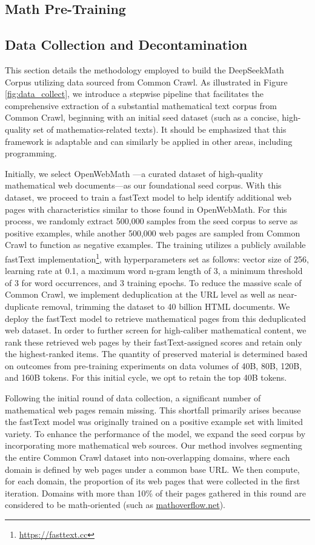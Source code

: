 \begin{itemize}[topsep=0pt]
\section{Math Pre-Training}

\subsection{Data Collection and Decontamination} This section details the methodology employed to build the DeepSeekMath Corpus utilizing data sourced from Common Crawl. As illustrated in Figure \ref{fig:data_collect}, we introduce a stepwise pipeline that facilitates the comprehensive extraction of a substantial mathematical text corpus from Common Crawl, beginning with an initial seed dataset (such as a concise, high-quality set of mathematics-related texts). It should be emphasized that this framework is adaptable and can similarly be applied in other areas, including programming.

Initially, we select OpenWebMath \citep{openwebmath}—a curated dataset of high-quality mathematical web documents—as our foundational seed corpus. With this dataset, we proceed to train a fastText model \citep{joulin2016fasttext} to help identify additional web pages with characteristics similar to those found in OpenWebMath. For this process, we randomly extract 500,000 samples from the seed corpus to serve as positive examples, while another 500,000 web pages are sampled from Common Crawl to function as negative examples. The training utilizes a publicly available fastText implementation\footnote{\url{https://fasttext.cc}}, with hyperparameters set as follows: vector size of 256, learning rate at 0.1, a maximum word n-gram length of 3, a minimum threshold of 3 for word occurrences, and 3 training epochs. To reduce the massive scale of Common Crawl, we implement deduplication at the URL level as well as near-duplicate removal, trimming the dataset to 40 billion HTML documents. We deploy the fastText model to retrieve mathematical pages from this deduplicated web dataset. In order to further screen for high-caliber mathematical content, we rank these retrieved web pages by their fastText-assigned scores and retain only the highest-ranked items. The quantity of preserved material is determined based on outcomes from pre-training experiments on data volumes of 40B, 80B, 120B, and 160B tokens. For this initial cycle, we opt to retain the top 40B tokens.

Following the initial round of data collection, a significant number of mathematical web pages remain missing. This shortfall primarily arises because the fastText model was originally trained on a positive example set with limited variety. To enhance the performance of the model, we expand the seed corpus by incorporating more mathematical web sources. Our method involves segmenting the entire Common Crawl dataset into non-overlapping domains, where each domain is defined by web pages under a common base URL. We then compute, for each domain, the proportion of its web pages that were collected in the first iteration. Domains with more than 10\% of their pages gathered in this round are considered to be math-oriented (such as \url{mathoverflow.net}).


\end{itemize}
